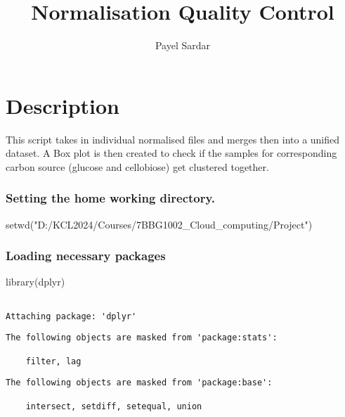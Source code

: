 \documentclass[
  letterpaper,
  DIV=11,
  numbers=noendperiod]{scrartcl}
\title{Normalisation Quality Control}
\author{Payel Sardar}
\date{}
\newenvironment{Shaded}{\begin{snugshade}}{\end{snugshade}}
\newcommand{\FunctionTok}[1]{\textcolor[rgb]{0.28,0.35,0.67}{#1}}
\newcommand{\NormalTok}[1]{\textcolor[rgb]{0.00,0.23,0.31}{#1}}
\newcommand{\StringTok}[1]{\textcolor[rgb]{0.13,0.47,0.30}{#1}}
\begin{document}
\maketitle


\section{Description}\label{description}

This script takes in individual normalised files and merges then into a
unified dataset. A Box plot is then created to check if the samples for
corresponding carbon source (glucose and cellobiose) get clustered
together.

\subsubsection{Setting the home working
directory.}\label{setting-the-home-working-directory.}

\begin{Shaded}
\begin{Highlighting}[]
\FunctionTok{setwd}\NormalTok{(}\StringTok{"D:/KCL2024/Courses/7BBG1002\_Cloud\_computing/Project"}\NormalTok{)}
\end{Highlighting}
\end{Shaded}

\subsubsection{Loading necessary
packages}\label{loading-necessary-packages}

\begin{Shaded}
\begin{Highlighting}[]
\FunctionTok{library}\NormalTok{(dplyr)}
\end{Highlighting}
\end{Shaded}

\begin{verbatim}

Attaching package: 'dplyr'
\end{verbatim}

\begin{verbatim}
The following objects are masked from 'package:stats':

    filter, lag
\end{verbatim}

\begin{verbatim}
The following objects are masked from 'package:base':

    intersect, setdiff, setequal, union
\end{verbatim}
\end{document}
